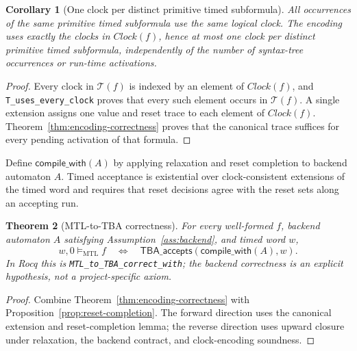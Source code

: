 \documentclass[10pt,journal,compsoc]{IEEEtran}
\newtheorem{theorem}{Theorem}[section]
\newtheorem{corollary}[theorem]{Corollary}
\newcommand{\satM}{\models_{\mathrm{MTL}}}
\newcommand{\T}{\mathcal{T}}
\newcommand{\Clock}{\mathit{Clock}}
\begin{document}
\begin{corollary}[One clock per distinct primitive timed subformula]
\label{cor:one-clock-formula}
All occurrences of the same primitive timed subformula use the same logical
clock. The encoding uses exactly the clocks in $\Clock(f)$, hence at most
one clock per distinct primitive timed subformula, independently of the
number of syntax-tree occurrences or run-time activations.
\end{corollary}
\begin{proof}
Every clock in $\T(f)$ is indexed by an element of $\Clock(f)$, and
\texttt{T\_uses\_every\_clock} proves that every such element occurs in
$\T(f)$. A single extension assigns one value and reset trace to each
element of $\Clock(f)$. Theorem~\ref{thm:encoding-correctness} proves that
the canonical trace suffices for every pending activation of that formula.
\end{proof}

Define $\mathsf{compile\_with}(A)$ by applying relaxation and reset
completion to backend automaton $A$. Timed acceptance is existential over
clock-consistent extensions of the timed word and requires that reset
decisions agree with the reset sets along an accepting run.
\begin{theorem}[MTL-to-TBA correctness]
\label{thm:mtl-to-tba-correct}
\label{cor:mtl-tba-correct}
For every well-formed $f$, backend automaton $A$ satisfying
Assumption~\ref{ass:backend}, and timed word $w$,
\[
w,0\satM f\quad\Longleftrightarrow\quad
\mathsf{TBA\_accepts}(\mathsf{compile\_with}(A),w).
\]
In Rocq this is \texttt{MTL\_to\_TBA\_correct\_with}; the backend
correctness is an explicit hypothesis, not a project-specific axiom.
\end{theorem}
\begin{proof}
Combine Theorem~\ref{thm:encoding-correctness} with
Proposition~\ref{prop:reset-completion}. The forward direction uses the
canonical extension and reset-completion lemma; the reverse direction uses
upward closure under relaxation, the backend contract, and clock-encoding
soundness.
\end{proof}
\end{document}
